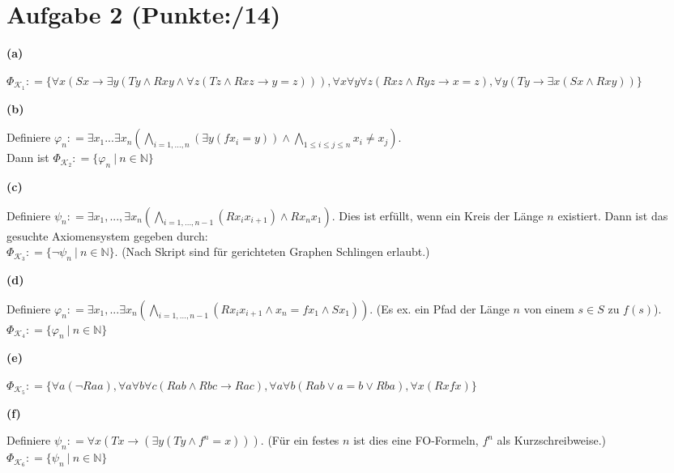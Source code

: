 \documentclass[11pt, a4paper]{article}
\newcommand{\p}{14}
\newcommand{\defgr}{\mathrel{\mathop:\!\!=}}
\begin{document}
\section*{Aufgabe 2 (Punkte:\qquad/\p)}
\textbf{(a)}
\begin{adjustwidth}{20pt}{20pt}
	$\Phi_{\mathcal{K}_1} \defgr \{\forall x(Sx \rightarrow \exists y(Ty \wedge Rxy \wedge \forall z(Tz \wedge Rxz \rightarrow y=z))),
	\forall x\forall y\forall z(Rxz \wedge Ryz \rightarrow x=z), \forall y(Ty \rightarrow \exists x(Sx \wedge Rxy))\}$
\end{adjustwidth}
\textbf{(b)}
\begin{adjustwidth}{20pt}{20pt}
	Definiere $\varphi_n \defgr \exists x_1...\exists x_n\left(\bigwedge_{i=1,...,n}(\exists y(fx_i = y)) \wedge \bigwedge_{1\leq i \leq j \leq n}x_i \neq x_j\right)$.\\ Dann ist
	$\Phi_{\mathcal{K}_2} \defgr \{ \varphi_n\ |\ n \in \mathbb{N}\}$
\end{adjustwidth}
\textbf{(c)}
\begin{adjustwidth}{20pt}{20pt}
	Definiere $\psi_n \defgr \exists x_1,...,\exists x_n(\bigwedge_{i=1,...,n-1}(Rx_ix_{i+1}) \wedge Rx_nx_1)$. Dies ist erfüllt, wenn ein Kreis der Länge $n$ existiert.
	Dann ist das gesuchte Axiomensystem gegeben durch:\\
	$\Phi_{\mathcal{K}_3} \defgr \{ \neg\psi_n\ |\ n \in \mathbb{N}\}$. (Nach Skript sind für gerichteten Graphen Schlingen erlaubt.)
\end{adjustwidth}
\textbf{(d)}
\begin{adjustwidth}{20pt}{20pt}
	Definiere $\varphi_n \defgr \exists x_1,...\exists x_n(\bigwedge_{i=1,...,n-1}(Rx_ix_{i+1} \wedge x_n=fx_1 \wedge Sx_1))$. (Es ex. ein Pfad der Länge $n$ von einem $s\in S$ zu $f(s)$). \\
	$\Phi_{\mathcal{K}_4} \defgr \{ \varphi_n\ |\ n \in \mathbb{N}\}$
\end{adjustwidth}
\textbf{(e)}
\begin{adjustwidth}{20pt}{20pt}
	$\Phi_{\mathcal{K}_5} \defgr \{\forall a(\neg Raa), \forall a\forall b \forall c(Rab \wedge Rbc \rightarrow Rac), \forall a \forall b(Rab \vee a=b \vee Rba), \forall x(Rxfx)\}$
\end{adjustwidth}
\textbf{(f)}
\begin{adjustwidth}{20pt}{20pt}
	Definiere $\psi_n \defgr \forall x(Tx \rightarrow(\exists y(Ty \wedge f^n=x)))$. (Für ein festes $n$ ist dies eine FO-Formeln, $f^n$ als Kurzschreibweise.) \\
	$\Phi_{\mathcal{K}_6} \defgr \{ \psi_n\ |\ n \in \mathbb{N}\}$
\end{adjustwidth}
\end{document}

